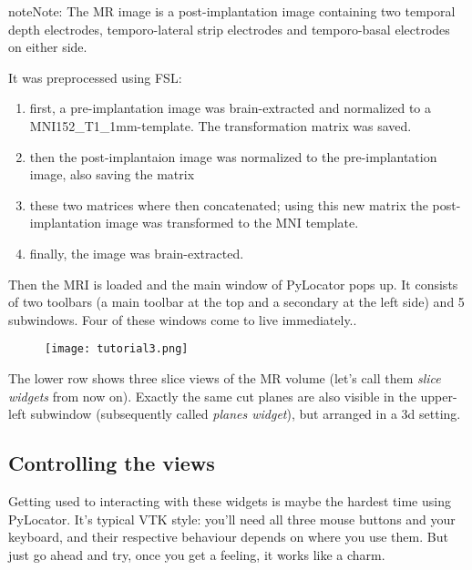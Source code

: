 \documentclass[letterpaper,10pt,english]{sphinxmanual}
\begin{document}
\begin{notice}{note}{Note:}
The MR image is a post-implantation image
containing two temporal depth electrodes, temporo-lateral strip electrodes
and temporo-basal electrodes on either side.

It was preprocessed using FSL:
\begin{enumerate}
\item {} 
first, a pre-implantation image was brain-extracted and normalized to a MNI152\_T1\_1mm-template. The transformation matrix was saved.

\item {} 
then the post-implantaion image was normalized to the pre-implantation image, also saving the matrix

\item {} 
these two matrices where then concatenated; using this new matrix the post-implantation image was transformed to the MNI template.

\item {} 
finally, the image was brain-extracted.

\end{enumerate}
\end{notice}

Then the MRI is loaded and the main window of PyLocator pops up. It consists
of two toolbars (a main toolbar at the top and a secondary at the left side)
and 5 subwindows. Four of these windows come to live immediately..
\begin{figure}[htbp]
\centering

\texttt{[image: tutorial3.png]}
\end{figure}

The lower row shows three slice views of the MR volume (let's call them \emph{slice
widgets} from now on). Exactly the same cut planes are also visible in the upper-left
subwindow (subsequently called \emph{planes widget}), but arranged in a 3d setting.


\subsection{Controlling the views}
\label{tutorial:controlling-the-views}
Getting used to interacting with these widgets is maybe the hardest time
using PyLocator. It's typical VTK style: you'll need all three mouse buttons
and your keyboard, and their respective behaviour depends on where you use
them. But just go ahead and try, once you get a feeling, it works like a charm.
\end{document}

